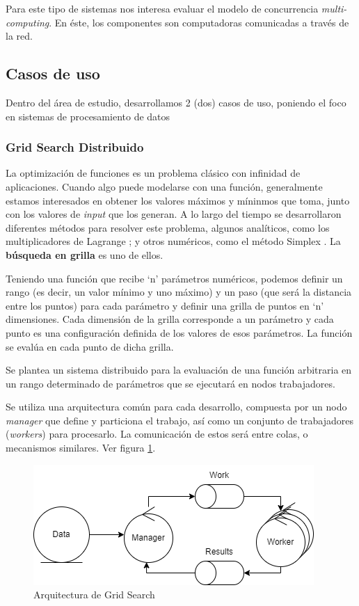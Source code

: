 \documentclass[11pt]{article}
\let\Oldsubsection\subsection
\renewcommand{\subsection}{\FloatBarrier\Oldsubsection}
\let\Oldsubsubsection\subsubsection
\renewcommand{\subsubsection}{\FloatBarrier\Oldsubsubsection}
\begin{document}
Para este tipo de sistemas nos interesa evaluar el modelo de concurrencia \textit{multi-computing}. En éste, los componentes son computadoras comunicadas a través de la red.

\subsection{Casos de uso}

Dentro del área de estudio, desarrollamos 2 (dos) casos de uso, poniendo el foco en sistemas de procesamiento de datos

\subsubsection{Grid Search Distribuido}

La optimización de funciones es un problema clásico con infinidad de aplicaciones. Cuando algo puede modelarse con una función, generalmente estamos interesados en obtener los valores máximos y míninmos que toma, junto con los valores de \textit{input} que los generan. A lo largo del tiempo se desarrollaron diferentes métodos para resolver este problema, algunos analíticos, como los multiplicadores de Lagrange \cite{sis_dist:lagrange}; y otros numéricos, como el método Simplex \cite{sis_dist:simplex}. La \textbf{búsqueda en grilla} es uno de ellos.

Teniendo una función que recibe `n' parámetros numéricos, podemos definir un rango (es decir, un valor mínimo y uno máximo) y un paso (que será la distancia entre los puntos) para cada parámetro y definir una grilla de puntos en `n' dimensiones.
Cada dimensión de la grilla corresponde a un parámetro y cada punto es una configuración definida de los valores de esos parámetros.
La función se evalúa en cada punto de dicha grilla.

Se plantea un sistema distribuido para la evaluación de una función arbitraria en un rango determinado de parámetros que se ejecutará en nodos trabajadores.

Se utiliza una arquitectura común para cada desarrollo, compuesta por un nodo \textit{manager} que define y particiona el trabajo, así como un conjunto de trabajadores (\textit{workers}) para procesarlo. La comunicación de estos será entre colas, o mecanismos similares. Ver figura \ref{fig:sis_dist:grid_search_arch}.

\begin{figure}[h]
    \centering
    \includegraphics[scale=0.5]{resources/distributed_systems/grid_search_arch.png}
    \caption{Arquitectura de Grid Search}
    \label{fig:sis_dist:grid_search_arch}
\end{figure}
\end{document}
